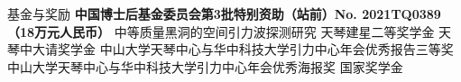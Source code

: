 \begin{rubric}{基金与奖励}
    \entry*[2021-2023] \textbf{中国博士后基金委员会第3批特别资助（站前）No. 2021TQ0389（18万元人民币）} 中等质量黑洞的空间引力波探测研究 
%
    \entry*[2020] 天琴建星二等奖学金
    \entry*[2019] 天琴中大请奖学金
    \entry*[2019] 中山大学天琴中心与华中科技大学引力中心年会优秀报告三等奖 
    \entry*[2018] 中山大学天琴中心与华中科技大学引力中心年会优秀海报奖
    \entry*[2015] 国家奖学金
\end{rubric}
